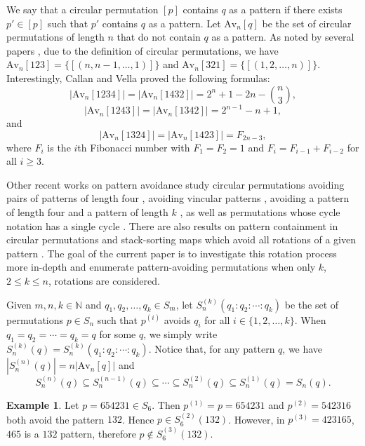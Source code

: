 \documentclass[11pt]{article}
\theoremstyle{definition}
\newtheorem{example}[theorem]{Example}
\numberwithin{equation}{section}
\begin{document}
We say that a circular permutation $[p]$ contains $q$ as a pattern if there 
exists $p'\in[p]$ such that $p'$ contains $q$ as a pattern. Let $\text{Av}_n[q]$ 
be the set of circular permutations of length $n$ that do not contain $q$ as a pattern. As noted by several papers \cite{Callan2002,DELMSSS2022}, due to the definition of circular permutations, we have $
\text{Av}_n[123]=\{[(n,n-1,\ldots,1)]\}$ and $
\text{Av}_n[321]=\{[(1,2,\ldots,n)]\}$. Interestingly, Callan \cite{Callan2002} and Vella \cite{Vella2003} proved the 
following formulas:
\[
|\text{Av}_n[1234]|=|\text{Av}_n[1432]|=2^n+1-2n-\binom{n}{3},
\]
\[
|\text{Av}_n[1243]|=|\text{Av}_n[1342]|=2^{n-1}-n+1,
\]
and
\[
|\text{Av}_n[1324]|=|\text{Av}_n[1423]|=F_{2n-3},
\]
where $F_i$ is the $i$th Fibonacci number with $F_1=F_2=1$ and $F_{i}=F_{i-1}+F_{i-2}$ for all $i\geq3$.

Other recent works on pattern avoidance study circular permutations avoiding pairs of patterns of length four \cite{DELMSSS2022}, avoiding vincular patterns \cite{ES2021,Li2022,MS2021}, avoiding a pattern of length four and a pattern of length $k$ \cite{MS2022}, as well as permutations whose cycle notation has a single cycle \cite{ABBGJ2023,ABBGJ2025}. There are also results on pattern containment in circular permutations \cite{DELMSSS2022,GLW2018} and stack-sorting maps which avoid all rotations of a given pattern \cite{ZB2026}. The goal of the current paper is to investigate this rotation process more in-depth and enumerate pattern-avoiding permutations when only $k$, $2\leq k\leq n$, rotations are considered. 

Given $m,n,k\in\mathbb{N}$ and $q_1,q_2,\ldots,q_k\in S_m$, let $S_{n}^{(k)}(q_1:q_2:\cdots:q_k)$ be the set of permutations $p\in S_n$ such that $p^{(i)}$ avoids $q_i$ for all $i\in\{1,2,\ldots,k\}$. When $q_1=q_2=\cdots=q_k=q$ for some $q$, we simply write $S_n^{(k)}(q)=S_n^{(k)}(q_1:q_2:\cdots:q_k)$. Notice that, for any pattern $q$, we have $|S_n^{(n)}(q)|=n|\text{Av}_n[q]|$ and 
\[
S_n^{(n)}(q)\subseteq S_n^{(n-1)}(q)\subseteq\cdots\subseteq S_n^{(2)}(q)\subseteq S_n^{(1)}(q)=S_n(q).
\]

\begin{example}
    Let $p=654231\in S_6$. Then $p^{(1)}=p=654231$ and $p^{(2)}=542316$ both avoid the pattern $132$. Hence $p\in S_6^{(2)}(132)$. 
However, in $p^{(3)}=423165$, $465$ is a $132$ pattern, therefore $p\notin S_6^{(3)}(132)$.
\end{example}
\end{document}
